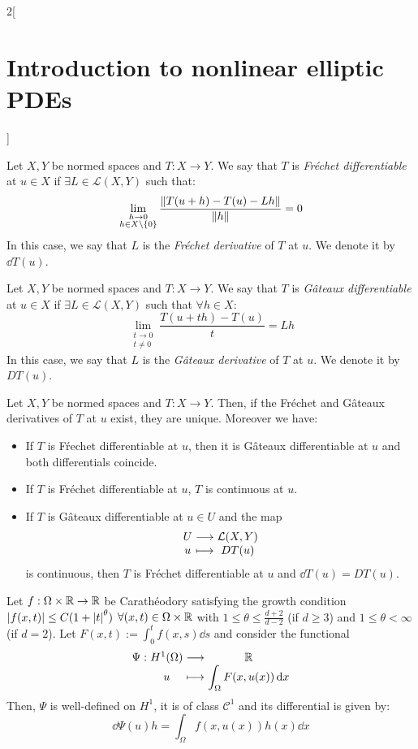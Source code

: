 \documentclass[../../../main_math.tex]{subfiles}
\begin{document}
\begin{multicols}{2}[\section{Introduction to nonlinear elliptic PDEs}]
\begin{definition}
    Let $X,Y$ be normed spaces and $T:X\to Y$. We say that $T$ is \emph{Fréchet differentiable} at $u\in X$ if $\exists L\in \mathcal{L}(X,Y)$ such that:
    $$
      \lim_{\substack{h\to 0\\h\in X\setminus\{0\}}}\frac{\left\|T(u+h)-T(u)-Lh\right\|}{\left\|h\right\|}=0
    $$
    In this case, we say that $L$ is the \emph{Fréchet derivative} of $T$ at $u$. We denote it by $\dd{T(u)}$.
  \end{definition}
  \begin{definition}
    Let $X,Y$ be normed spaces and $T:X\to Y$. We say that $T$ is \emph{Gâteaux differentiable} at $u\in X$ if $\exists L\in \mathcal{L}(X,Y)$ such that $\forall h\in X$:
    $$
      \lim_{\substack{t\to 0\\t\ne 0}}\frac{T(u+th)-T(u)}{t}=Lh
    $$
    In this case, we say that $L$ is the \emph{Gâteaux derivative} of $T$ at $u$. We denote it by $D{T}(u)$.
  \end{definition}
  \begin{lemma}
    Let $X,Y$ be normed spaces and $T:X\to Y$. Then, if the Fréchet and Gâteaux derivatives of $T$ at $u$ exist, they are unique. Moreover we have:
    \begin{itemize}
      \item If $T$ is Fŕechet differentiable at $u$, then it is Gâteaux differentiable at $u$ and both differentials coincide.
      \item If $T$ is Fréchet differentiable at $u$, $T$ is continuous at $u$.
      \item If $T$ is Gâteaux differentiable at $u\in U$ and the map
            $$
              \function{}{U}{\mathcal{L}(X,Y)}{u}{DT(u)}
            $$
            is continuous, then $T$ is Fréchet differentiable at $u$ and $\dd{T(u)}=DT(u)$.
    \end{itemize}
  \end{lemma}
  \begin{proposition}\label{INEPDE:minimization_prop2}
    Let $f:\Omega\times \mathbb{R}\to\mathbb{R}$ be Carathéodory satisfying the growth condition $\abs{f(x,t)}\leq C(1+\abs{t}^\theta)$ $\forall (x,t)\in \Omega\times \mathbb{R}$ with $1\leq \theta\leq \frac{d+2}{d-2}$ (if $d\geq 3$) and $1\leq \theta<\infty$ (if $d=2$). Let $F(x,t):=\int_0^tf(x,s)\dd{s}$ and consider the functional
    $$
      \function{\Psi}{H^1(\Omega)}{\RR}{u}{\displaystyle\int_\Omega F(x,u(x))\dd{x}}
    $$
    Then, $\Psi$ is well-defined on $H^1$, it is of class $\mathcal{C}^1$ and its differential is given by:
    $$
      \dd{\Psi(u)}h=\int_\Omega f(x,u(x))h(x)\dd{x}
$$
\end{proposition}
\end{multicols}
\end{document}
